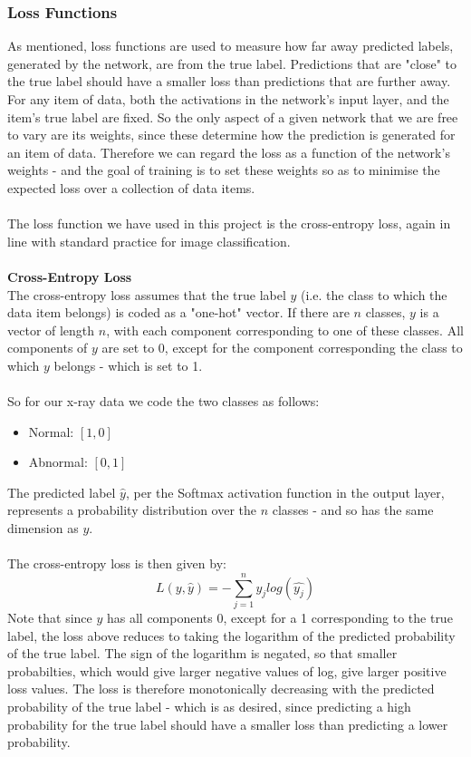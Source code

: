 \documentclass[11pt]{article} %
\theoremstyle{plain}
\theoremstyle{definition}
\begin{document}
\subsubsection{Loss Functions}
As mentioned, loss functions are used to measure how far away predicted labels, generated by the network, are from the true label. Predictions that are "close" to the true label should have a smaller loss than predictions that are further away. For any item of data, both the activations in the network's input layer, and the item's true label are fixed. So the only aspect of a given network that we are free to vary are its weights, since these determine how the prediction is generated for an item of data. Therefore we can regard the loss as a function of the network's weights - and the goal of training is to set these weights so as to minimise the expected loss over a collection of data items.
\\
\\
\noindent
The loss function we have used in this project is the cross-entropy loss, again in line with standard practice for image classification.
\\
\\
\noindent
\textbf{Cross-Entropy Loss}
\\
\noindent
The cross-entropy loss assumes that the true label \(y\) (i.e. the class to which the data item belongs) is coded as a "one-hot" vector. If there are \(n\) classes, \(y\) is a vector of length \(n\), with each component corresponding to one of these classes. All components of \(y\) are set to 0, except for the component corresponding the class to which \(y\) belongs - which is set to 1. 
\\
\\
\noindent
So for our x-ray data we code the two classes as follows:
\begin{itemize}
  \item Normal: \([1, 0]\)   
  \item Abnormal: \([0, 1]\)   
\end{itemize}
The predicted label $\hat{y}$, per the Softmax activation function in the output layer, represents a probability distribution over the \(n\) classes - and so has the same dimension as \(y\).
\\
\\
\noindent
The cross-entropy loss is then given by:
\[L(y,\hat{y}) = - \sum_{j=1}^n y_jlog(\hat{y_j})   \]
Note that since \(y\) has all components 0, except for a 1 corresponding to the true label, the loss above reduces to taking the logarithm of the predicted probability of the true label. The sign of the logarithm is negated, so that smaller probabilties, which would give larger negative values of log, give larger positive loss values. The loss is therefore monotonically decreasing with the predicted probability of the true label - which is as desired, since predicting a high probability for the true label should have a smaller loss than predicting a lower probability.  
\end{document}
